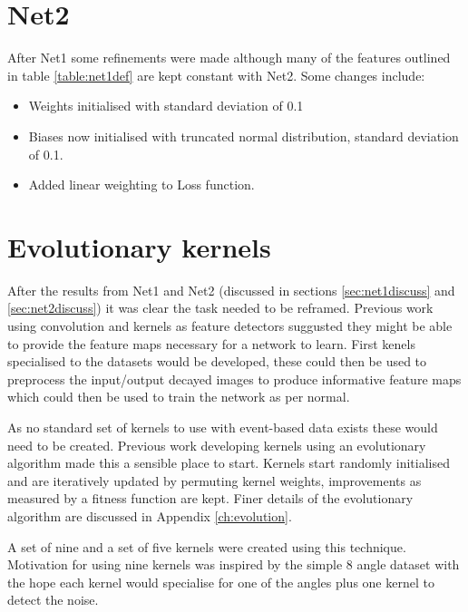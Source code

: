 \section{Net2}
After Net1 some refinements were made although many of the features outlined in table \ref{table:net1def} are kept constant with Net2. 
Some changes include:
\begin{itemize}
    \item Weights initialised with standard deviation of 0.1
    \item Biases now initialised with truncated normal distribution, standard deviation of 0.1. 
    \item Added linear weighting to Loss function.
\end{itemize}

\section{Evolutionary kernels}
After the results from Net1 and Net2 (discussed in sections \ref{sec:net1discuss} and \ref{sec:net2discuss}) it was clear the task needed to be reframed. 
Previous work using convolution and kernels as feature detectors suggusted they might be able to provide the feature maps necessary for a network to learn. 
First kenels specialised to the datasets would be developed, these could then be used to preprocess the input/output decayed images to produce informative feature maps which could then be used to train the network as per normal. 


As no standard set of kernels to use with event-based data exists these would need to be created.
Previous work developing kernels using an evolutionary algorithm made this a sensible place to start.
Kernels start randomly initialised and are iteratively updated by permuting kernel weights, improvements as measured by a fitness function are kept.
Finer details of the evolutionary algorithm are discussed in Appendix \ref{ch:evolution}.

A set of nine and a set of five kernels were created using this technique.
Motivation for using nine kernels was inspired by the simple 8 angle dataset with the hope each kernel would specialise for one of the angles plus one kernel to detect the noise. 

